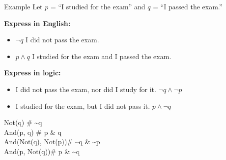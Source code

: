 \documentclass[aspectratio=169]{beamer}
\begin{document}
\begin{frame}[t]{Example}
  Let $p$ = ``I studied for the exam'' and $q$ = ``I passed the exam.''
  \vspace{0.5em}

  \textbf{Express in English:}
  \begin{itemize}
    \item $\neg q$ \hfill I did not pass the exam.
    \item $p \wedge q$ \hfill I studied for the exam and I passed the exam.
  \end{itemize}
  \vspace{0.5em}

  \textbf{Express in logic:}
  \begin{itemize}
    \item I did not pass the exam, nor did I study for it.
          \hfill $\neg q \wedge \neg p$
    \item I studied for the exam, but I did not pass it.
          \hfill $p \wedge \neg q$
  \end{itemize}
  \vspace{0.5em}

  \begin{tcolorbox}[spstyle, title=SymPy --- verify]
    Not(q)\quad\quad\quad\quad\quad\quad\quad\quad
    \# \textasciitilde{}q\\
    And(p, q)\quad\quad\quad\quad\quad\quad\quad
    \# p \& q\\
    And(Not(q), Not(p))\quad\quad\# \textasciitilde{}q \& \textasciitilde{}p\\
    And(p, Not(q))\quad\quad\quad\quad\# p \& \textasciitilde{}q
  \end{tcolorbox}
\end{frame}
\end{document}
